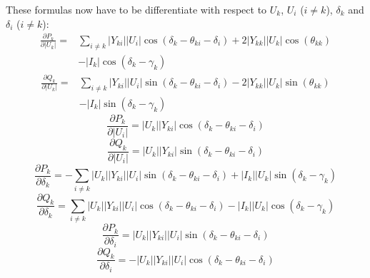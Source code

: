 These formulas now have to be differentiate with respect to $U_k$, $U_i$ ($i \ne k$), $\delta_k$ and $\delta_i$ ($i \ne k$):
\begin{equation}
	\begin{split}
		\frac{\partial P_k}{\partial |U_k|} = 
			& \sum_{i \ne k} |Y_{ki}| |U_i| \cos \left( \delta_k - \theta_{ki} - \delta_i \right) + 2 |Y_{kk}| |U_k| \cos \left( \theta_{kk} \right) \\
			& - |I_k| \cos \left( \delta_k - \gamma_k \right)
	\end{split}
\end{equation}
\begin{equation}
	\begin{split}
		\frac{\partial Q_k}{\partial |U_k|} = 
			& \sum_{i \ne k} |Y_{ki}| |U_i| \sin \left( \delta_k - \theta_{ki} - \delta_i \right) - 2 |Y_{kk}| |U_k| \sin \left( \theta_{kk} \right) \\
			& - |I_k| \sin \left( \delta_k - \gamma_k \right)
	\end{split}
\end{equation}
\begin{equation}
	\frac{\partial P_k}{\partial |U_i|} = |U_k| |Y_{ki}| \cos \left( \delta_k - \theta_{ki} - \delta_i \right)
\end{equation}
\begin{equation}
	\frac{\partial Q_k}{\partial |U_i|} = |U_k| |Y_{ki}| \sin \left( \delta_k - \theta_{ki} - \delta_i \right)
\end{equation}
\begin{equation}
	\frac{\partial P_k}{\partial \delta_k} = - \sum_{i \ne k} |U_k| |Y_{ki}| |U_i| \sin \left( \delta_k - \theta_{ki} - \delta_i \right) + |I_k| |U_k| \sin \left( \delta_k - \gamma_k \right)
\end{equation}
\begin{equation}
	\frac{\partial Q_k}{\partial \delta_k} = \sum_{i \ne k} |U_k| |Y_{ki}| |U_i| \cos \left( \delta_k - \theta_{ki} - \delta_i \right) - |I_k| |U_k| \cos \left( \delta_k - \gamma_k \right)
\end{equation}
\begin{equation}
	\frac{\partial P_k}{\partial \delta_i} = |U_k| |Y_{ki}| |U_i| \sin \left( \delta_k - \theta_{ki} - \delta_i \right)
\end{equation}
\begin{equation}
	\frac{\partial Q_k}{\partial \delta_i} = - |U_k| |Y_{ki}| |U_i| \cos \left( \delta_k - \theta_{ki} - \delta_i \right)
\end{equation}

